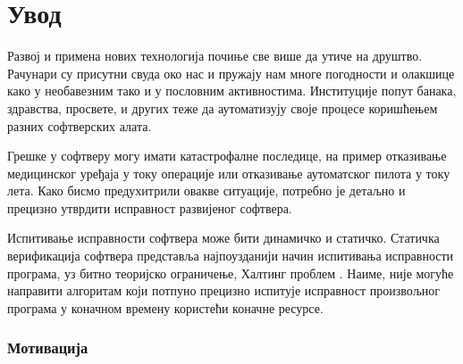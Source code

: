 \documentclass[12pt,oneside]{memoir}
\begin{document}
\frontmatter
\naslovna
\komisija
\apstrakt
\mainmatter
\tableofcontents





\chapter{Увод} 
 Развој и примена нових технологија почиње све више да утиче на друштво. Рачунари су присутни свуда око нас и пружају нам многе погодности и олакшице како у необавезним тако и у пословним активностима. Институције попут банака, здравства, просвете, и других теже да аутоматизују своје процесе коришћењем разних софтверских алата.  
 
 Грешке у софтверу могу имати катастрофалне последице, на пример отказивање медицинског уређаја у току операције или отказивање аутоматског пилота у току лета. Како бисмо предухитрили овакве ситуације, потребно је детаљно и прецизно утврдити исправност развијеног софтвера. 
 
  Испитивање исправности софтвера може бити динамичко и статичко. Статичка верификација софтвера представља најпоузданији начин испитивања исправности програма, уз битно теоријско ограничење, Халтинг проблем \cite{halting}. Наиме, није могуће направити алгоритам који потпуно прецизно испитује исправност произвољног програма у коначном времену користећи коначне ресурсе. \\
\subsection{Мотивација}
\end{document}
